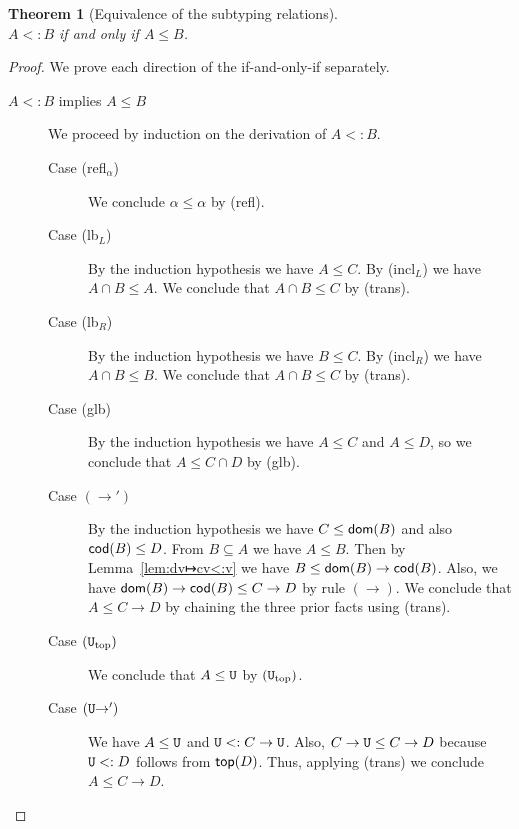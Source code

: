 \documentclass{article}
\newtheorem{theorem}{Theorem}
\begin{document}
\begin{theorem}[Equivalence of the subtyping relations]\ \\
  $A <: B$ if and only if $A \leq B$.
\end{theorem}
\begin{proof}
  We prove each direction of the if-and-only-if separately.
  \begin{description}
  \item[$A <: B$ implies $A \leq B$]
    We proceed by induction on the derivation of $A <: B$.
    \begin{description}
    \item[Case (refl$_\alpha$)] We conclude $\alpha \leq \alpha$ by (refl).      
    \item[Case (lb$_L$)] By the induction hypothesis we have $A \leq C$.
      By (incl$_L$) we have $A \cap B \leq A$. We conclude
      that $A \cap B \leq C$ by (trans).
    \item[Case (lb$_R$)] By the induction hypothesis we have $B \leq C$.
      By (incl$_R$) we have $A \cap B \leq B$. We conclude
      that $A \cap B \leq C$ by (trans).
    \item[Case (glb)] By the induction hypothesis we have
      $A \leq C$ and $A \leq D$, so we conclude that
      $A \leq C \cap D$ by (glb).
    \item[Case $(\to')$] By the induction hypothesis we have
      $C \leq \mathsf{dom}(B)$ and also $\mathsf{cod}(B) \leq D$.
      From $B \subseteq A$ we have $A \leq B$.      
      Then by Lemma~\ref{lem:dv↦cv<:v} we have
      $B \leq \mathsf{dom}(B) \to \mathsf{cod}(B)$.
      Also, we have $\mathsf{dom}(B) \to \mathsf{cod}(B) \leq C \to D$ by rule $(\to)$.
      We conclude that $A \leq C \to D$ by chaining the three prior
      facts using (trans).
    \item[Case $(\mathtt{U}_{\mathrm{top}})$]
      We conclude that $A \leq \mathtt{U}$ by $(\mathtt{U}_{\mathrm{top}})$.
    \item[Case $(\mathtt{U}{\to}')$] We have $A \leq \mathtt{U}$ and $\mathtt{U} <: C \to
      \mathtt{U}$.  Also, $C \to \mathtt{U} \leq C \to D$ because $\mathtt{U} <: D$ follows
      from $\mathsf{top}(D)$.  Thus, applying (trans) we conclude $A \leq C \to
      D$.
    \end{description}
    

\end{description}
\end{proof}
\end{document}

